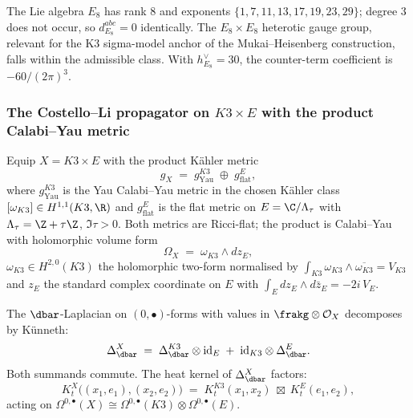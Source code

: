 \begin{example}[$\frakg = E_8$, the maximal simply-laced admissible case]
\label{ex:e8-trilinear-vanishing}
The Lie algebra $E_8$ has rank $8$ and exponents
$\{1, 7, 11, 13, 17, 19, 23, 29\}$; degree $3$ does not occur, so
$d^{abc}_{E_8} = 0$ identically. The $E_8 \times E_8$ heterotic gauge
group, relevant for the K3 sigma-model anchor of the Mukai--Heisenberg
construction, falls within the admissible class. With
$h^\vee_{E_8} = 30$, the counter-term coefficient is
$-60/(2\pi)^3$.
\end{example}

\subsubsection{The Costello--Li propagator on \texorpdfstring{$K3 \times E$}{K3 x E} with the product Calabi--Yau metric}
\label{subsubsec:costello-li-propagator-k3xe}

Equip $X = K3 \times E$ with the product K\"ahler metric
\begin{equation}
\label{eq:product-cy-metric-k3xe}
 g_X \;=\; g_{\mathrm{Yau}}^{K3} \;\oplus\; g_{\mathrm{flat}}^E,
\end{equation}
where $g_{\mathrm{Yau}}^{K3}$ is the Yau Calabi--Yau metric in the chosen
K\"ahler class $[\omega_{K3}] \in H^{1,1}(K3, \R)$ \cite{Yau1978} and
$g_{\mathrm{flat}}^E$ is the flat metric on $E = \C/\Lambda_\tau$ with
$\Lambda_\tau = \Z + \tau \Z$, $\Im \tau > 0$. Both metrics are
Ricci-flat; the product is Calabi--Yau with holomorphic volume form
\[
 \Omega_X \;=\; \omega_{K3} \wedge dz_E,
\]
$\omega_{K3} \in H^{2,0}(K3)$ the holomorphic two-form normalised by
$\int_{K3} \omega_{K3} \wedge \overline{\omega_{K3}} = V_{K3}$ and
$z_E$ the standard complex coordinate on $E$ with
$\int_E dz_E \wedge d\bar z_E = -2 i\, V_E$.

The $\dbar$-Laplacian on $(0, \bullet)$-forms with values in
$\frakg \otimes \mathcal{O}_X$ decomposes by Künneth:
\begin{equation}
\label{eq:laplacian-kunneth-k3xe}
 \Delta_{\dbar}^X \;=\; \Delta_{\dbar}^{K3} \otimes \mathrm{id}_E \;+\; \mathrm{id}_{K3} \otimes \Delta_{\dbar}^E.
\end{equation}
Both summands commute. The heat kernel of $\Delta_{\dbar}^X$ factors:
\begin{equation}
\label{eq:heat-kernel-kunneth-k3xe}
 K_t^X\bigl((x_1, e_1), (x_2, e_2)\bigr) \;=\;
 K_t^{K3}(x_1, x_2) \;\boxtimes\; K_t^E(e_1, e_2),
\end{equation}
acting on $\Omega^{0, \bullet}(X) \cong \Omega^{0, \bullet}(K3) \otimes \Omega^{0, \bullet}(E)$.

